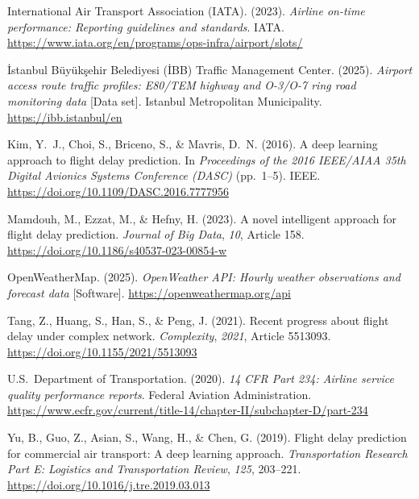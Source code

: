 \documentclass{report}
\begin{document}
\begin{list}{}{%
  \setlength{\leftmargin}{1.5em}%
  \setlength{\itemindent}{-1.5em}%
  \setlength{\itemsep}{6pt}%
  \setlength{\parsep}{0pt}%
  \setlength{\topsep}{0pt}%
}
\item International Air Transport Association (IATA). (2023).
\textit{Airline on-time performance: Reporting guidelines and standards}.
IATA.
\url{https://www.iata.org/en/programs/ops-infra/airport/slots/}

\item \. Istanbul B\"{u}y\"{u}k\c{s}ehir Belediyesi (\. IBB) Traffic Management Center. (2025).
\textit{Airport access route traffic profiles: E80/TEM highway and O-3/O-7 ring road
monitoring data} [Data set]. Istanbul Metropolitan Municipality.
\url{https://ibb.istanbul/en}

\item Kim, Y.\ J., Choi, S., Briceno, S., \& Mavris, D.\ N. (2016).
A deep learning approach to flight delay prediction.
In \textit{Proceedings of the 2016 IEEE/AIAA 35th Digital Avionics Systems Conference (DASC)}
(pp.\ 1--5). IEEE.
\url{https://doi.org/10.1109/DASC.2016.7777956}

\item Mamdouh, M., Ezzat, M., \& Hefny, H. (2023).
A novel intelligent approach for flight delay prediction.
\textit{Journal of Big Data}, \textit{10}, Article 158.
\url{https://doi.org/10.1186/s40537-023-00854-w}

\item OpenWeatherMap. (2025). \textit{OpenWeather API: Hourly weather observations and forecast data}
[Software]. \url{https://openweathermap.org/api}

\item Tang, Z., Huang, S., Han, S., \& Peng, J. (2021).
Recent progress about flight delay under complex network.
\textit{Complexity}, \textit{2021}, Article 5513093.
\url{https://doi.org/10.1155/2021/5513093}

\item U.S.\ Department of Transportation. (2020).
\textit{14 CFR Part 234: Airline service quality performance reports}.
Federal Aviation Administration.
\url{https://www.ecfr.gov/current/title-14/chapter-II/subchapter-D/part-234}

\item Yu, B., Guo, Z., Asian, S., Wang, H., \& Chen, G. (2019).
Flight delay prediction for commercial air transport: A deep learning approach.
\textit{Transportation Research Part E: Logistics and Transportation Review},
\textit{125}, 203--221.
\url{https://doi.org/10.1016/j.tre.2019.03.013}





\end{list}
\end{document}

